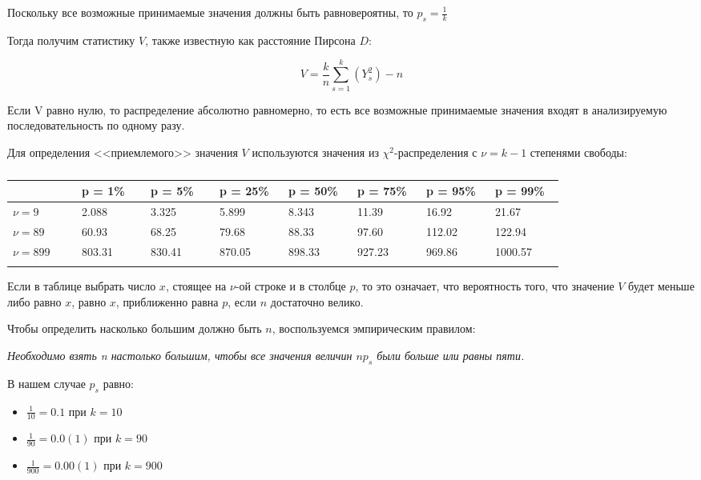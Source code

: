 \documentclass[a4paper,12pt]{article}
\begin{document}
	Поскольку все возможные принимаемые значения должны быть равновероятны, то $p_s = \frac{1}{k}$
	
	Тогда получим статистику $V$, также известную как расстояние Пирсона $D$:
	
	\[
	V = \frac{k}{n}\sum_{s = 1}^{k}\left(Y_s^2\right) - n
	\]
	
	Если V равно нулю, то распределение абсолютно равномерно, то есть все возможные принимаемые значения входят в анализируемую последовательность по одному разу.
	
	
	Для определения <<приемлемого>> значения $V$ используются значения из $\chi^2$-распределения с $\nu = k - 1$ степенями свободы:
	
	\begin{center}
		\begin{longtable}[h!]{|p{0.1\linewidth}|p{0.1\linewidth}|p{0.1\linewidth}|p{0.1\linewidth}|p{0.1\linewidth}|p{0.1\linewidth}|p{0.1\linewidth}|p{0.1\linewidth}|}
			\hline
			{} & {p = 1\%} & {p = 5\%} & {p = 25\%} & {p = 50\%} & {p = 75\%} & {p = 95\%} & {p = 99\%}\\
			\hline
			{$\nu = 9$} & {2.088} & {3.325} & {5.899} & {8.343} & {11.39} & {16.92} & {21.67}\\
			\hline
			{$\nu = 89$} & {60.93} & {68.25} & {79.68} & {88.33} & {97.60} & {112.02} & {122.94}\\
			\hline
			{$\nu = 899$} & {803.31} & {830.41} & {870.05} & {898.33} & {927.23} & {969.86} & {1000.57}\\
			\hline
			\caption{}
		\end{longtable}
	\end{center}

	Если в таблице выбрать число $x$, стоящее на $\nu$-ой строке и в столбце $p$, то это означает, что вероятность того, что значение $V$ будет меньше либо равно $x$, равно $x$, приближенно равна $p$, если $n$ достаточно велико.
	
	Чтобы определить насколько большим должно быть $n$, воспользуемся эмпирическим правилом:
	
	\textit{Необходимо взять n настолько большим, чтобы все значения величин $n p_s$ были больше или равны пяти.}
	
	В нашем случае $p_s$ равно:
	
	\begin{itemize}
		\item $\frac{1}{10} = 0.1$ при $k = 10$
		\item $\frac{1}{90} = 0.0(1)$ при $k = 90$
		\item $\frac{1}{900} = 0.00(1)$ при $k = 900$
	\end{itemize}
\end{document}

